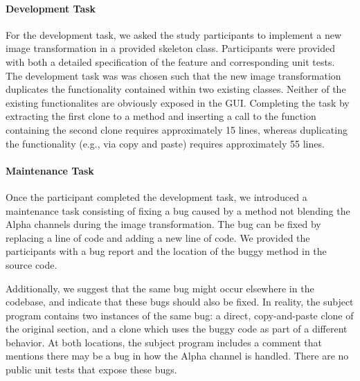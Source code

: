 \documentclass[nocopyrightspace,10pt]{sigplanconf}
\begin{document}
\paragraph{Development Task}

For the development task, we asked the study participants to implement
a new image transformation in a provided skeleton class. Participants
were provided with both a detailed specification of the feature and
corresponding unit tests. The development task was was chosen such
that the new image transformation duplicates the functionality
contained within two existing classes. Neither of the existing 
functionalites are obviously exposed in the GUI.
Completing the task by extracting 
the first clone to a method and inserting a call to the function containing 
the second clone requires approximately 15 lines, whereas
duplicating the functionality (e.g., via copy and paste) requires
approximately 55 lines.

\paragraph{Maintenance Task}

Once the participant completed the development task, we introduced a
maintenance task consisting of fixing a bug caused by a method not
blending the Alpha channels during the image transformation. The bug
can be fixed by replacing a line of code and adding a new line of
code. We provided the participants with a bug report and the location
of the buggy method in the source code.

Additionally, we suggest that the same bug might occur elsewhere in
the codebase, and indicate that these bugs should also be fixed.  In
reality, the subject program contains two instances of the same bug: a
direct, copy-and-paste clone of the original section, and a clone
which uses the buggy code as part of a different behavior.  At both
locations, the subject program includes a comment that mentions there
may be a bug in how the Alpha channel is handled. There are no public
unit tests that expose these bugs.
\end{document}
